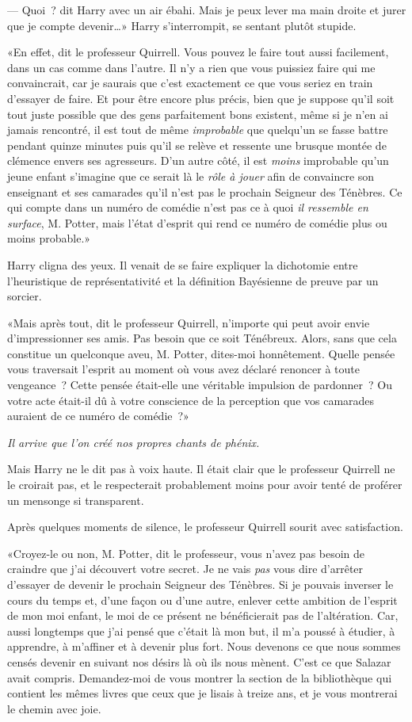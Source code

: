 --- Quoi~? dit Harry avec un air ébahi. Mais je peux lever ma main droite et jurer que je compte devenir…» Harry s'interrompit, se sentant plutôt stupide.

«En effet, dit le professeur Quirrell. Vous pouvez le faire tout aussi facilement, dans un cas comme dans l'autre. Il n'y a rien que vous puissiez faire qui me convaincrait, car je saurais que c'est exactement ce que vous seriez en train d'essayer de faire. Et pour être encore plus précis, bien que je suppose qu'il soit tout juste possible que des gens parfaitement bons existent, même si je n'en ai jamais rencontré, il est tout de même \emph{improbable} que quelqu'un se fasse battre pendant quinze minutes puis qu'il se relève et ressente une brusque montée de clémence envers ses agresseurs. D'un autre côté, il est \emph{moins} improbable qu'un jeune enfant s'imagine que ce serait là le \emph{rôle à jouer} afin de convaincre son enseignant et ses camarades qu'il n'est pas le prochain Seigneur des Ténèbres. Ce qui compte dans un numéro de comédie n'est pas ce à quoi \emph{il ressemble en surface}, M. Potter, mais l'état d'esprit qui rend ce numéro de comédie plus ou moins probable.»

Harry cligna des yeux. Il venait de se faire expliquer la dichotomie entre l'heuristique de représentativité et la définition Bayésienne de preuve par un sorcier.

«Mais après tout, dit le professeur Quirrell, n'importe qui peut avoir envie d'impressionner ses amis. Pas besoin que ce soit Ténébreux. Alors, sans que cela constitue un quelconque aveu, M. Potter, dites-moi honnêtement. Quelle pensée vous traversait l'esprit au moment où vous avez déclaré renoncer à toute vengeance~? Cette pensée était-elle une véritable impulsion de pardonner~? Ou votre acte était-il dû à votre conscience de la perception que vos camarades auraient de ce numéro de comédie~?»

\emph{Il arrive que l'on créé nos propres chants de phénix.}

Mais Harry ne le dit pas à voix haute. Il était clair que le professeur Quirrell ne le croirait pas, et le respecterait probablement moins pour avoir tenté de proférer un mensonge si transparent.

Après quelques moments de silence, le professeur Quirrell sourit avec satisfaction.

«Croyez-le ou non, M. Potter, dit le professeur, vous n'avez pas besoin de craindre que j'ai découvert votre secret. Je ne vais \emph{pas} vous dire d'arrêter d'essayer de devenir le prochain Seigneur des Ténèbres. Si je pouvais inverser le cours du temps et, d'une façon ou d'une autre, enlever cette ambition de l'esprit de mon moi enfant, le moi de ce présent ne bénéficierait pas de l'altération. Car, aussi longtemps que j'ai pensé que c'était là mon but, il m'a poussé à étudier, à apprendre, à m'affiner et à devenir plus fort. Nous devenons ce que nous sommes censés devenir en suivant nos désirs là où ils nous mènent. C'est ce que Salazar avait compris. Demandez-moi de vous montrer la section de la bibliothèque qui contient les mêmes livres que ceux que je lisais à treize ans, et je vous montrerai le chemin avec joie.

